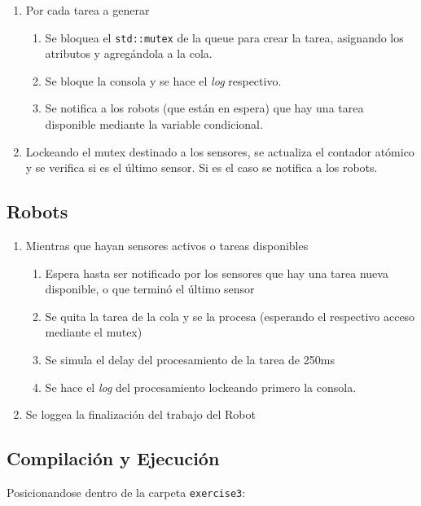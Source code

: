 \documentclass[11pt, a4paper]{article}
\begin{document}
\begin{multicols}{2}
\begin{enumerate}[label=\Roman*.]
    \item Por cada tarea a generar 
    \begin{enumerate}[label=\roman*.]
        \item Se bloquea el \texttt{std::mutex} de la queue para crear la tarea, asignando los atributos y agregándola a la cola.
        \item Se bloque la consola y se hace el \textit{log} respectivo.
        \item Se notifica a los robots (que están en espera) que hay una tarea disponible mediante la variable condicional.
    \end{enumerate}
    \item Lockeando el mutex destinado a los sensores, se actualiza el contador atómico y se verifica si es el último sensor. Si es el caso se notifica a los robots.
\end{enumerate}

\subsection{Robots}

\begin{enumerate}[label=\Roman*.]
    \item Mientras que hayan sensores activos o tareas disponibles
    \begin{enumerate}[label=\roman*.]
        \item Espera hasta ser notificado por los sensores que hay una tarea nueva disponible,
        o que terminó el último sensor
        \item Se quita la tarea de la cola y se la procesa (esperando el respectivo acceso mediante
        el mutex)
        \item Se simula el delay del procesamiento de la tarea de 250ms
        \item Se hace el \textit{log} del procesamiento lockeando primero la consola.
    \end{enumerate}
    \item Se loggea la finalización del trabajo del Robot
\end{enumerate}

\subsection{Compilación y Ejecución}

Posicionandose dentro de la carpeta \texttt{exercise3}:


\end{multicols}
\end{document}
